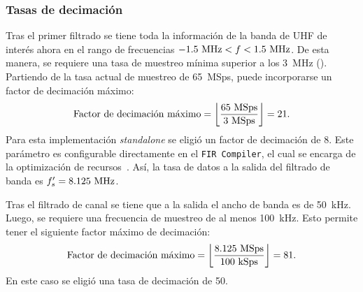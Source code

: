 \documentclass[../../main.tex]{subfiles}
\begin{document}

\subsubsection{Tasas de decimación}
Tras el primer filtrado se tiene toda la información de la banda de UHF de interés ahora en el rango de frecuencias $-1.5~\textrm{MHz}<f<1.5~\textrm{MHz}$. De esta manera, se requiere una tasa de muestreo mínima superior a los 3~MHz (\cite{teorema-del-muestreo}). Partiendo de la tasa actual de muestreo de 65~MSps, puede incorporarse un factor de decimación máximo:
\[\textrm{Factor de decimación máximo} = \left\lfloor\frac{65~\textrm{MSps}}{3~\textrm{MSps}}\right\rfloor = 21.\]
Para esta implementación \textit{standalone} se eligió un factor de decimación de 8. Este parámetro es configurable directamente en el \texttt{FIR Compiler}, el cual se encarga de la optimización de recursos~\cite{fir-compiler}. Así, la tasa de datos a la salida del filtrado de banda es $f'_s = 8.125~\textrm{MHz}$.

Tras el filtrado de canal se tiene que a la salida el ancho de banda es de 50~kHz. Luego, se requiere una frecuencia de muestreo de al menos 100~kHz. Esto permite tener el siguiente factor máximo de decimación:
\[\textrm{Factor de decimación máximo} = \left\lfloor\frac{8.125~\textrm{MSps}}{100~\textrm{kSps}}\right\rfloor = 81.\] En este caso se eligió una tasa de decimación de 50.

\begin{table}[H]
    \centering
    \caption{Configuraciones principales de los filtros de banda y de haz.}
    \label{tab::filtros-preproc}
\end{table}
\end{document}
